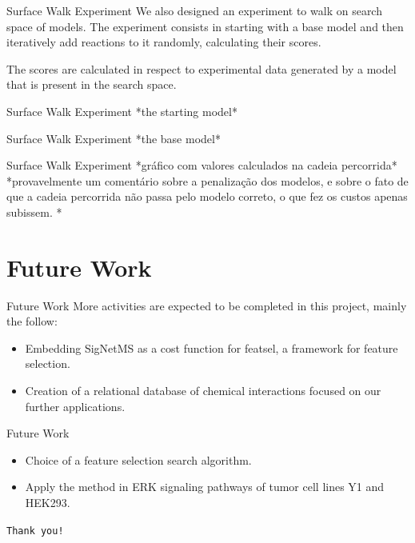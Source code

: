 \documentclass{beamer}
\begin{document}
\begin{frame}{Surface Walk Experiment}
We also designed an experiment to walk on search space of models. The
experiment consists in starting with a base model and then iteratively 
add reactions to it randomly, calculating their scores. 

\pause
The scores are calculated in respect to experimental data generated by
a model that is present in the search space.
\end{frame}


\begin{frame}{Surface Walk Experiment}
    *the starting model*
\end{frame}

\begin{frame}{Surface Walk Experiment}
    *the base model*
\end{frame}

\begin{frame}{Surface Walk Experiment}
    *gráfico com valores calculados na cadeia percorrida*
    *provavelmente um comentário sobre a penalização dos modelos, e 
    sobre o fato de que a cadeia percorrida não passa pelo modelo 
    correto, o que fez os custos apenas subissem. *
\end{frame}

\section{Future Work}

\begin{frame}{Future Work}
More activities are expected to be completed in this project, mainly the
follow:
\begin{itemize}
    \item{} Embedding SigNetMS as a cost function for featsel, a 
        framework for feature selection.
    \pause
    \item{} Creation of a relational database of chemical 
        interactions focused on our further applications.
    \end{itemize}
\end{frame}


\begin{frame}{Future Work}
\begin{itemize}
    \item{} Choice of a feature selection search algorithm.
    \pause
    \item{} Apply the method in ERK signaling 
        pathways of tumor cell lines Y1 and HEK293.
\end{itemize}
\end{frame}

\begin{frame}{}
\begin{center}
    \texttt{Thank you!}
\end{center}
\end{frame}
\end{document}
